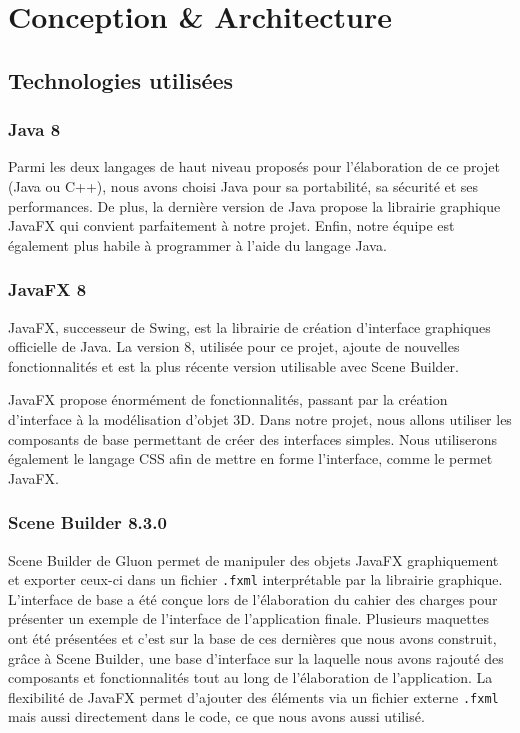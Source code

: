 \section{Conception \& Architecture}
\subsection{Technologies utilisées}
\subsubsection{Java 8}
Parmi les deux langages de haut niveau proposés pour l'élaboration de ce projet (Java ou C++), nous avons choisi Java pour sa portabilité, sa sécurité et ses performances. De plus, la dernière version de Java propose la librairie graphique JavaFX qui convient parfaitement à notre projet. Enfin, notre équipe est également plus habile à programmer à l'aide du langage Java.

\subsubsection{JavaFX 8}
JavaFX, successeur de Swing, est la librairie de création d'interface graphiques officielle de Java. La version 8, utilisée pour ce projet, ajoute de nouvelles fonctionnalités et est la plus récente version utilisable avec Scene Builder.

JavaFX propose énormément de fonctionnalités, passant par la création d'interface à la modélisation d'objet 3D. Dans notre projet, nous allons utiliser les composants de base permettant de créer des interfaces simples. Nous utiliserons également le langage CSS afin de mettre en forme l'interface, comme le permet JavaFX.

\subsubsection{Scene Builder 8.3.0}
Scene Builder de Gluon permet de manipuler des objets JavaFX graphiquement et exporter ceux-ci dans un fichier \texttt{.fxml} interprétable par la librairie graphique. L'interface de base a été conçue lors de l'élaboration du cahier des charges pour présenter un exemple de l'interface de l'application finale. Plusieurs maquettes ont été présentées et c'est sur la base de ces dernières que nous avons construit, grâce à Scene Builder, une base d'interface sur la laquelle nous avons rajouté des composants et fonctionnalités tout au long de l'élaboration de l'application. La flexibilité de JavaFX permet d'ajouter des éléments via un fichier externe \texttt{.fxml} mais aussi directement dans le code, ce que nous avons aussi utilisé.

